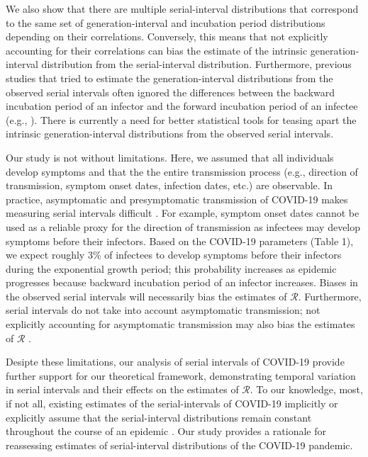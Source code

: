 \documentclass[12pt]{article}
\begin{document}
We also show that there are multiple serial-interval distributions that correspond to the same set of generation-interval and incubation period distributions depending on their correlations.
Conversely, this means that not explicitly accounting for their correlations can bias the estimate of the intrinsic generation-interval distribution from the serial-interval distribution.
Furthermore, previous studies that tried to estimate the generation-interval distributions from the observed serial intervals often ignored the differences between the backward incubation period of an infector and the forward incubation period of an infectee (e.g., \cite{klinkenberg2011correlation, ganyani2020estimating}).
There is currently a need for better statistical tools for teasing apart the intrinsic generation-interval distributions from the observed serial intervals.

Our study is not without limitations.
Here, we assumed that all individuals develop symptoms and that the the entire transmission process (e.g., direction of transmission, symptom onset dates, infection dates, etc.) are observable.
In practice, asymptomatic and presymptomatic transmission of COVID-19 makes measuring serial intervals difficult \citep{bai2020presumed,he2020temporal,wei2020presymptomatic}.
For example, symptom onset dates cannot be used as a reliable proxy for the direction of transmission as infectees may develop symptoms before their infectors.
Based on the COVID-19 parameters (Table 1), we expect roughly 3\% of infectees to develop symptoms before their infectors during the exponential growth period; 
this probability increases as epidemic progresses because backward incubation period of an infector increases.
Biases in the observed serial intervals will necessarily bias the estimates of $\mathcal R$. 
Furthermore, serial intervals do not take into account asymptomatic transmission; 
not explicitly accounting for asymptomatic transmission may also bias the estimates of $\mathcal R$ \citep{park2020time}.

Desipte these limitations, our analysis of serial intervals of COVID-19 provide further support for our theoretical framework, demonstrating temporal variation in serial intervals and their effects on the estimates of $\mathcal R$.
To our knowledge, most, if not all, existing estimates of the serial-intervals of COVID-19 implicitly or explicitly assume that the serial-interval distributions remain constant throughout the course of an epidemic \citep{du2020serial, he2020temporal, nishiura2020serial,tindale2020transmission,zhao2020estimating,zhang2020evolving}.
Our study provides a rationale for reassessing estimates of serial-interval distributions of the COVID-19 pandemic.
\end{document}
